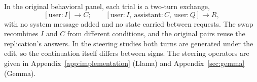 In the original behavioral panel, each trial is a two-turn exchange,
\[
 [\mathrm{user}:I]\longrightarrow C;\qquad
 [\mathrm{user}:I,\ \mathrm{assistant}:C,\ \mathrm{user}:Q]
 \longrightarrow R,
\]
with no system message added and no state carried between requests. The
swap recombines $I$ and $C$ from different conditions, and the original pairs
reuse the replication's answers. In the steering studies both turns are
generated under the edit, so the continuation itself differs between signs.
The steering operators are given in Appendix~\ref{app:implementation} (Llama)
and Appendix~\ref{sec:gemma} (Gemma).
